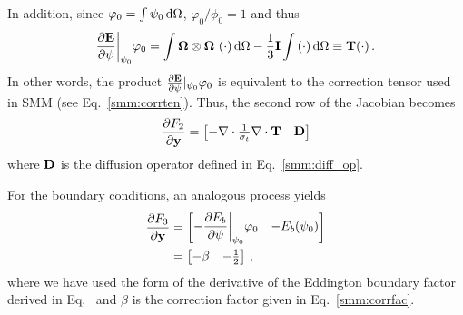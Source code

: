 \documentclass[../doc.tex]{subfiles}
\begin{document}
In addition, since $\varphi_0 = \int \psi_0 \mathop{}\!\mathrm{d} \Omega$, $\varphi_0/\phi_0 = 1$ and thus  
	\begin{equation}
		\frac{\partial \boldsymbol{\mathrm{E}}}{\partial \psi}\biggr\rvert_{\psi_0} \varphi_0 = \int \boldsymbol{\Omega}\otimes\boldsymbol{\Omega}\, \left( \cdot \right)\mathop{}\!\mathrm{d}\Omega  - \frac{1}{3}\boldsymbol{\mathrm{I}} \int \left( \cdot \right)\mathop{}\!\mathrm{d}\Omega \equiv \boldsymbol{\mathrm{T}}(\cdot) \,. 
	\end{equation}
In other words, the product $\frac{\partial \boldsymbol{\mathrm{E}}}{\partial \psi}|_{\psi_0}\varphi_0$ is equivalent to the correction tensor used in SMM (see Eq.~\ref{smm:corrten}). Thus, the second row of the Jacobian becomes
	\begin{equation}
		\frac{\partial F_2}{\partial \boldsymbol{\mathrm{y}}} = \begin{bmatrix} 
			-\nabla\cdot\frac{1}{\sigma_t}\nabla\cdot\boldsymbol{\mathrm{T}} & \boldsymbol{\mathrm{D}} 
		\end{bmatrix}
	\end{equation}
where $\boldsymbol{\mathrm{D}}$ is the diffusion operator defined in Eq.~\ref{smm:diff_op}. 

For the boundary conditions, an analogous process yields
	\begin{equation}
	\begin{aligned}
		\frac{\partial F_3}{\partial \boldsymbol{\mathrm{y}}} &= \begin{bmatrix} 
			\displaystyle-\frac{\partial E_b}{\partial \psi}\biggr\rvert_{\psi_0} \varphi_0 & -E_b(\psi_0) 
		\end{bmatrix} \\
		&= \begin{bmatrix} 
			-\beta & -\frac{1}{2} 
		\end{bmatrix} \,,
	\end{aligned}
	\end{equation}
where we have used the form of the derivative of the Eddington boundary factor derived in Eq.~ and $\beta$ is the correction factor given in Eq.~\ref{smm:corrfac}. 
\end{document}
